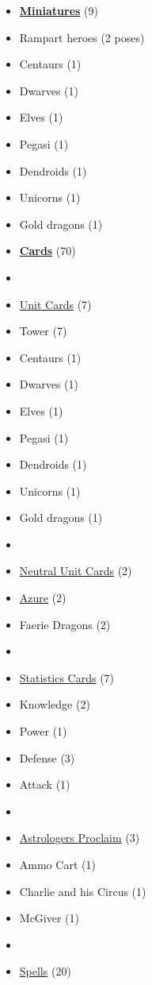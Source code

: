 \begin{multicols}{3}
\begin{itemize}[leftmargin=0pt, label={}, noitemsep, noitemsep]
  \item \textbf{\underline{Miniatures}} (9)
  \item Rampart heroes (2 poses)
  \item Centaurs (1)
  \item Dwarves (1)
  \item Elves (1)
  \item Pegasi (1)
  \item Dendroids (1)
  \item Unicorns (1)
  \item Gold dragons (1)
\end{itemize}

\begin{itemize}[leftmargin=0pt, label={}, noitemsep, noitemsep]
  \item \textbf{\underline{Cards}} (70)
  \item
  \item \underline{Unit Cards} (7)
  \item Tower (7)
  \item Centaurs (1)
  \item Dwarves (1)
  \item Elves (1)
  \item Pegasi (1)
  \item Dendroids (1)
  \item Unicorns (1)
  \item Gold dragons (1)
  \item
  \item \underline{Neutral Unit Cards} (2)
  \item \underline{Azure} (2)
  \item Faerie Dragons (2)
  \item
  \item \underline{Statistics Cards} (7)
  \item Knowledge (2)
  \item Power (1)
  \item Defense (3)
  \item Attack (1)
  \item
  \item \underline{Astrologers Proclaim} (3)
  \item Ammo Cart (1)
  \item Charlie and his Circus (1)
  \item McGiver (1)
  \item
  \item \underline{Spells} (20)

\end{itemize}
\end{multicols}
